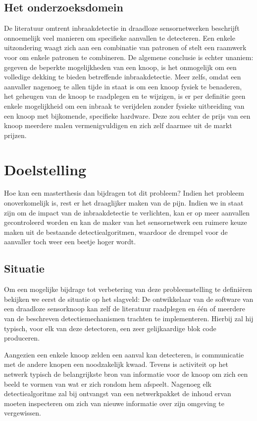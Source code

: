 \documentclass[12pt,a4paper,draft]{article}
\begin{document}
\subsection*{Het onderzoeksdomein}

De literatuur omtrent inbraakdetectie in draadloze sensornetwerken beschrijft
onnoemelijk veel manieren om specifieke aanvallen te detecteren. Een enkele
uitzondering waagt zich aan een combinatie van patronen of stelt een raamwerk
voor om enkele patronen te combineren. De algemene conclusie is echter unaniem:
gegeven de beperkte mogelijkheden van een knoop, is het onmogelijk om een
volledige dekking te bieden betreffende inbraakdetectie. Meer zelfs, omdat een
aanvaller nagenoeg te allen tijde in staat is om een knoop fysiek te benaderen,
het geheugen van de knoop te raadplegen en te wijzigen, is er per definitie
geen enkele mogelijkheid om een inbraak te verijdelen zonder fysieke
uitbreiding van een knoop met bijkomende, specifieke hardware. Deze zou echter
de prijs van een knoop meerdere malen vermenigvuldigen en zich zelf daarmee uit
de markt prijzen.

\section*{Doelstelling}

Hoe kan een masterthesis dan bijdragen tot dit probleem? Indien het probleem
onoverkomelijk is, rest er het draaglijker maken van de pijn. Indien we in
staat zijn om de impact van de inbraakdetectie te verlichten, kan er op meer
aanvallen gecontroleerd worden en kan de maker van het sensornetwerk een
ruimere keuze maken uit de bestaande detectiealgoritmen, waardoor de drempel
voor de aanvaller toch weer een beetje hoger wordt.

\subsection*{Situatie}

Om een mogelijke bijdrage tot verbetering van deze probleemstelling te
defini\"eren bekijken we eerst de situatie op het slagveld: De ontwikkelaar van
de software van een draadloze sensorknoop kan zelf de literatuur raadplegen en
\'e\'en of meerdere van de beschreven detectiemechanismen trachten te
implementeren. Hierbij zal hij typisch, voor elk van deze detectoren, een zeer
gelijkaardige blok code produceren.

Aangezien een enkele knoop zelden een aanval kan detecteren, is communicatie
met de andere knopen een noodzakelijk kwaad. Tevens is activiteit op het
netwerk typisch de belangrijkste bron van informatie voor de knoop om zich een
beeld te vormen van wat er zich rondom hem afspeelt. Nagenoeg elk
detectiealgoritme zal bij ontvangst van een netwerkpakket de inhoud ervan
moeten inspecteren om zich van nieuwe informatie over zijn omgeving te
vergewissen.
\end{document}
